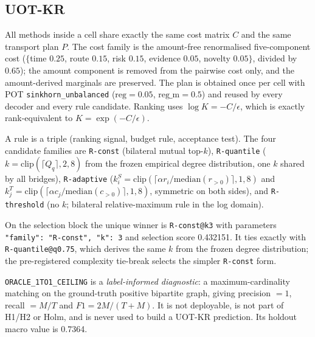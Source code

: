 \subsection{UOT-KR}
All methods inside a cell share exactly the same cost matrix $C$ and the same transport
plan $P$. The cost family is the amount-free renormalised five-component cost
($\{$time $0.25$, route $0.15$, risk $0.15$, evidence $0.05$, novelty $0.05\}$, divided by
$0.65$); the amount component is removed from the pairwise cost only, and the
amount-derived marginals are preserved. The plan is obtained once per cell with POT
\texttt{sinkhorn\_unbalanced} ($\mathrm{reg}=0.05$, $\mathrm{reg\_m}=0.5$) and
reused by every decoder and every rule candidate. Ranking uses
$\log K = -C/\epsilon$, which is exactly rank-equivalent to $K=\exp(-C/\epsilon)$.

A rule is a triple (ranking signal, budget rule, acceptance test). The four candidate
families are \texttt{R-const} (bilateral mutual top-$k$), \texttt{R-quantile}
($k=\mathrm{clip}(\lceil Q_q\rceil,2,8)$ from the frozen empirical degree distribution,
one $k$ shared by all bridges), \texttt{R-adaptive}
($k_i^S=\mathrm{clip}(\lceil\alpha r_i/\mathrm{median}(r_{>0})\rceil,1,8)$ and
$k_j^T=\mathrm{clip}(\lceil\alpha c_j/\mathrm{median}(c_{>0})\rceil,1,8)$, symmetric on
both sides), and \texttt{R-threshold} (no $k$; bilateral relative-maximum rule in the log
domain).

On the selection block the unique winner is \texttt{R-const@k3} with parameters
\texttt{{"family": "R-const", "k": 3}} and selection score
0.432151. It ties exactly with \texttt{R-quantile@q0.75}, which derives the
same $k$ from the frozen degree distribution; the pre-registered complexity tie-break
selects the simpler \texttt{R-const} form.

\texttt{ORACLE\_1TO1\_CEILING} is a \emph{label-informed diagnostic}: a maximum-cardinality
matching on the ground-truth positive bipartite graph, giving precision $=1$,
recall $=M/T$ and $F1 = 2M/(T+M)$. It is not deployable, is not part of H1/H2 or Holm, and
is never used to build a UOT-KR prediction. Its holdout macro value is
0.7364.
